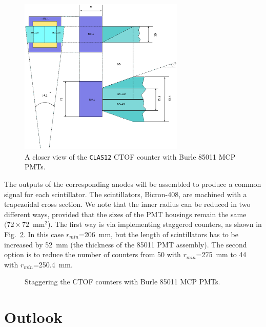 \begin{figure} [htbp]
\centering
\includegraphics[width=0.7\textwidth]{JLABH85011.ps}
\caption{\small{A closer view of the {\tt CLAS12} CTOF counter with Burle
85011 MCP PMTs.}}
\label{JLABH85011}
\end{figure}

The outputs of the corresponding anodes will be assembled to produce a common 
signal for each scintillator.  The scintillators, Bicron-408, are machined 
with a trapezoidal cross section.  We note that the inner radius can be 
reduced in two different ways, provided that the sizes of the PMT housings 
remain the same $(72\times72$~mm$^2$).  The first way is via implementing  
staggered counters, as shown in Fig.~\ref{JLABH85011-1}.  In this case 
$r_{min}$=206~mm, but the length of scintillators has to be increased by 
52~mm (the thickness of the 85011 PMT assembly).  The second option is to 
reduce the number of counters from 50 with $r_{min}$=275~mm to 44 with 
$r_{min}$=250.4~mm.

\begin{figure} [htbp]
\vspace{7.7cm}
\caption{\small{Staggering the CTOF counters with Burle 85011 MCP PMTs.}}
\label{JLABH85011-1}
\end{figure}

\section{Outlook}


